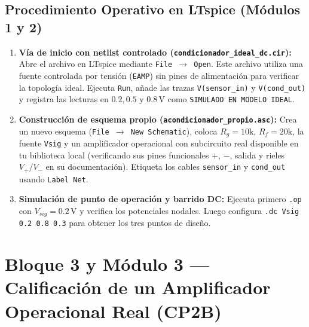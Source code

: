 \documentclass[11pt, a4paper]{article}
\begin{document}
\subsection{Procedimiento Operativo en LTspice (Módulos 1 y 2)}
\begin{enumerate}[noitemsep]
    \item \textbf{Vía de inicio con netlist controlado (\texttt{condicionador\_ideal\_dc.cir}):} Abre el archivo en LTspice mediante \texttt{File $\to$ Open}. Este archivo utiliza una fuente controlada por tensión (\texttt{EAMP}) sin pines de alimentación para verificar la topología ideal. Ejecuta \texttt{Run}, añade las trazas \texttt{V(sensor\_in)} y \texttt{V(cond\_out)} y registra las lecturas en $0.2, 0.5$ y $0.8\,\text{V}$ como \texttt{SIMULADO EN MODELO IDEAL}.
    \item \textbf{Construcción de esquema propio (\texttt{acondicionador\_propio.asc}):} Crea un nuevo esquema (\texttt{File $\to$ New Schematic}), coloca $R_g = 10\text{k}$, $R_f = 20\text{k}$, la fuente \texttt{Vsig} y un amplificador operacional con subcircuito real disponible en tu biblioteca local (verificando sus pines funcionales $+$, $-$, salida y rieles $V_+/V_-$ en su documentación). Etiqueta los cables \texttt{sensor\_in} y \texttt{cond\_out} usando \texttt{Label Net}.
    \item \textbf{Simulación de punto de operación y barrido DC:} Ejecuta primero \texttt{.op} con $V_{sig} = 0.2\,\text{V}$ y verifica los potenciales nodales. Luego configura \texttt{.dc Vsig 0.2 0.8 0.3} para obtener los tres puntos de diseño.
\end{enumerate}

\newpage
\section{Bloque 3 y Módulo 3 — Calificación de un Amplificador Operacional Real (CP2B)}
\end{document}
